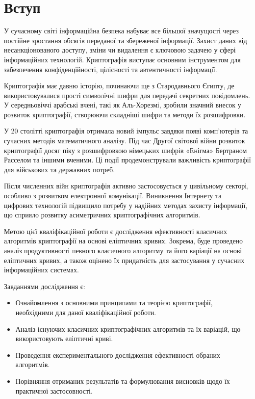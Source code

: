 \documentclass[12pt]{report}
\theoremstyle{definition}
\theoremstyle{plain}
\begin{document}
\tableofcontents

\chapter*{Вступ}

У сучасному світі інформаційна безпека набуває все більшої значущості через постійне зростання обсягів переданої та збереженої інформації. Захист даних від несанкціонованого доступу, зміни чи видалення є ключовою задачею у сфері інформаційних технологій. Криптографія виступає основним інструментом для забезпечення конфіденційності, цілісності та автентичності інформації.

Криптографія має давню історію, починаючи ще з Стародавнього Єгипту, де використовувалися прості символічні шифри для передачі секретних повідомлень. У середньовіччі арабські вчені, такі як Аль-Хорезмі, зробили значний внесок у розвиток криптографії, створюючи складніші шифри та методи їх розшифровки.

У 20 столітті криптографія отримала новий імпульс завдяки появі комп'ютерів та сучасних методів математичного аналізу. Під час Другої світової війни розвиток криптографії досяг піку з розшифровкою німецьких шифрів «Енігма» Бертраном Расселом та іншими вченими. Ці події продемонстрували важливість криптографії для військових та державних потреб.

Після численних війн криптографія активно застосовується у цивільному секторі, особливо з розвитком електронної комунікації. Виникнення Інтернету та цифрових технологій підвищило потребу у надійних методах захисту інформації, що сприяло розвитку асиметричних криптографічних алгоритмів.

Метою цієї кваліфікаційної роботи є дослідження ефективності класичних алгоритмів криптографії на основі еліптичних кривих. Зокрема, буде проведено аналіз продуктивності певного класичного алгоритму та його варіації на основі еліптичних кривих, а також оцінено їх придатність для застосування у сучасних інформаційних системах.

Завданнями дослідження є:
\begin{itemize}
    \item Ознайомлення з основними принципами та теорією криптографії, необхідними для даної кваліфікаційної роботи.
    \item Аналіз існуючих класичних криптографічних алгоритмів та їх варіацій, що використовують еліптичні криві.
    \item Проведення експериментального дослідження ефективності обраних алгоритмів.
    \item Порівняння отриманих результатів та формулювання висновків щодо їх практичної застосовності.
\end{itemize}
\end{document}
